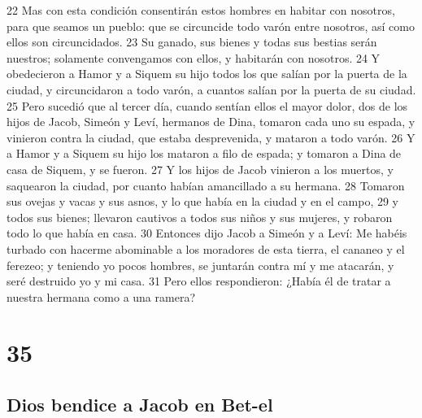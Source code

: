 22 Mas con esta condición consentirán estos hombres en habitar con nosotros, para que seamos un pueblo: que se circuncide todo varón entre nosotros, así como ellos son circuncidados.
23 Su ganado, sus bienes y todas sus bestias serán nuestros; solamente convengamos con ellos, y habitarán con nosotros.
24 Y obedecieron a Hamor y a Siquem su hijo todos los que salían por la puerta de la ciudad, y circuncidaron a todo varón, a cuantos salían por la puerta de su ciudad.
25 Pero sucedió que al tercer día, cuando sentían ellos el mayor dolor, dos de los hijos de Jacob, Simeón y Leví, hermanos de Dina, tomaron cada uno su espada, y vinieron contra la ciudad, que estaba desprevenida, y mataron a todo varón.
26 Y a Hamor y a Siquem su hijo los mataron a filo de espada; y tomaron a Dina de casa de Siquem, y se fueron.
27 Y los hijos de Jacob vinieron a los muertos, y saquearon la ciudad, por cuanto habían amancillado a su hermana.
28 Tomaron sus ovejas y vacas y sus asnos, y lo que había en la ciudad y en el campo,
29 y todos sus bienes; llevaron cautivos a todos sus niños y sus mujeres, y robaron todo lo que había en casa.
30 Entonces dijo Jacob a Simeón y a Leví: Me habéis turbado con hacerme abominable a los moradores de esta tierra, el cananeo y el ferezeo; y teniendo yo pocos hombres, se juntarán contra mí y me atacarán, y seré destruido yo y mi casa.
31 Pero ellos respondieron: ¿Había él de tratar a nuestra hermana como a una ramera?

\chapter{35}

\section{Dios bendice a Jacob en Bet-el}


